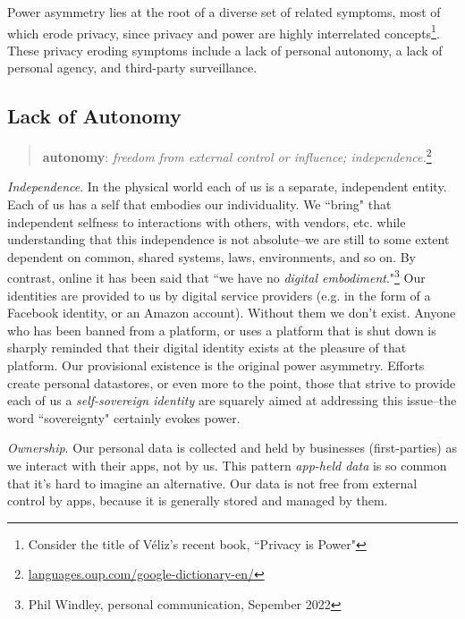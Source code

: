 \documentclass[11pt, oneside]{article}   	%
\newcommand{\hyperfootnote}[1][]{\def\ArgI{{#1}}\hyperfootnoteRelay}
\newcommand\hyperfootnoteRelay[2][]{\href{#1#2}{\ArgI}\footnote{\href{#1#2}{#2}}}
\begin{document}
Power asymmetry lies at the root of a diverse set of related symptoms, most of which erode privacy, since privacy and power are highly interrelated concepts\footnote{Consider the title of V\'eliz's recent book, ``Privacy is Power"\cite{veliz2020}}. 
These privacy eroding symptoms include a lack of personal autonomy, a lack of personal agency, and third-party surveillance. 

\subsection{Lack of Autonomy}

\begin{quote}
\textbf{au\hspace{0.5mm}\tiny {}\normalsize \hspace{0.5mm}ton\hspace{0.5mm}\tiny {}\normalsize \hspace{0.5mm}o\hspace{0.5mm}\tiny {}\normalsize \hspace{0.5mm}my}: \emph{freedom from external control or influence; independence.}\hyperfootnote[][https://]{languages.oup.com/google-dictionary-en/}
\end{quote}

\emph{Independence}. In the physical world each of us is a separate, independent entity. Each of us has a self that embodies our individuality. We ``bring" that independent selfness to interactions with others, with vendors, etc. while understanding that this independence is not absolute--we are still to some extent dependent on common, shared systems, laws, environments, and so on. By contrast, online it has been said that ``we have no \emph{digital embodiment}."\footnote{Phil Windley, personal communication, Sepember 2022}  Our identities are provided to us by digital service providers (e.g. in the form of a Facebook identity, or an Amazon account). Without them we don't exist. Anyone who has been banned from a platform, or uses a platform that is shut down is sharply reminded that their digital identity exists at the pleasure of that platform. Our provisional existence is the original power asymmetry. Efforts create personal datastores, or even more to the point, those that strive to provide each of us a \emph{self-sovereign identity}\cite{Preukschat2021} are squarely aimed at addressing this issue--the word ``sovereignty" certainly evokes power.

\emph{Ownership}. Our personal data is collected and held by businesses (first-parties) as we interact with their apps, not by us. This pattern \emph{app-held data} is so common that it's hard to imagine an alternative. Our data is not free from external control by apps, because it is generally stored and managed by them. 
\end{document}
